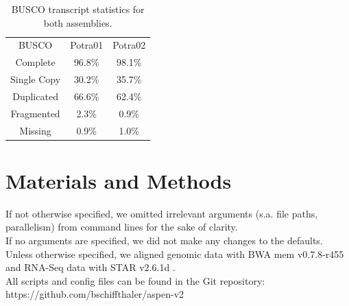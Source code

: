 \documentclass{article}
\begin{document}
\begin{table}
\caption{BUSCO transcript statistics for both assemblies.}
\label{T3}
\begin{center}
\begin{tabular}{|c|c|c|}
\hline
BUSCO & Potra01 & Potra02 \\
Complete & 96.8\% & 98.1\% \\
Single Copy & 30.2\% & 35.7\% \\
Duplicated & 66.6\% & 62.4\% \\
Fragmented & 2.3\% & 0.9\% \\
Missing & 0.9\% & 1.0\% \\
\hline
\end{tabular}
\end{center}
\end{table}

\section{Materials and Methods}

If not otherwise specified, we omitted irrelevant arguments (s.a. file paths, parallelism) from command lines for the sake of clarity.\\
If no arguments are specified, we did not make any changes to the defaults.\\
Unless otherwise specified, we aligned genomic data with BWA mem v0.7.8-r455 \citep{li2013aligning} and RNA-Seq data with STAR v2.6.1d \citep{dobin2013star}.\\
All scripts and config files can be found in the Git repository: https://github.com/bschiffthaler/aspen-v2\\
\end{document}
